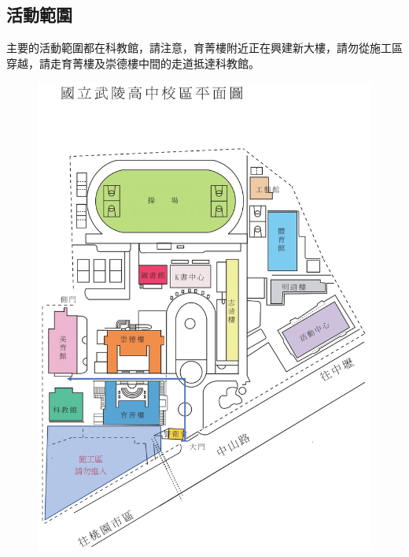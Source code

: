 \subsection{活動範圍}
主要的活動範圍都在科教館，請注意，育菁樓附近正在興建新大樓，請勿從施工區穿越，請走育菁樓及崇德樓中間的走道抵達科教館。
\begin{center}
\begin{figure}[H]
\centering
\includegraphics[width=15cm, center]{map.jpg}
\end{figure}
\end{center}
